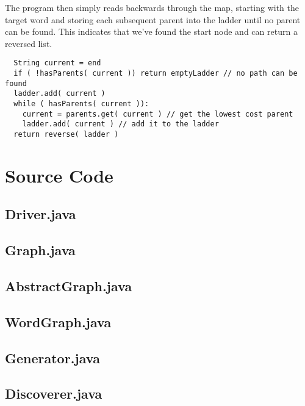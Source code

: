 \documentclass[12pt, titlepage, a4paper, oneside]{article}
\begin{document}
\par
The program then simply reads backwards through the map, starting with the target
word and storing each subsequent parent into the ladder until no parent can be
found. This indicates that we've found the start node and can return a
reversed list.
\begin{verbatim}
  String current = end
  if ( !hasParents( current )) return emptyLadder // no path can be found
  ladder.add( current )
  while ( hasParents( current )):
    current = parents.get( current ) // get the lowest cost parent
    ladder.add( current ) // add it to the ladder
  return reverse( ladder )
\end{verbatim}

\newpage
\section*{Source Code}

\subsection*{Driver.java}

\newpage

\subsection*{Graph.java}

\newpage

\subsection*{AbstractGraph.java}

\newpage

\subsection*{WordGraph.java}

\newpage

\subsection*{Generator.java}

\newpage

\subsection*{Discoverer.java}

\newpage
\end{document}
